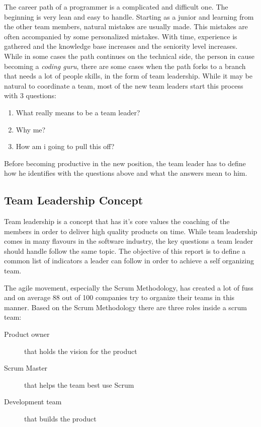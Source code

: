 
The career path of a programmer is a complicated and difficult one. The beginning is very lean and easy to handle. Starting as a junior and learning from the other team members, natural mistakes are usually made. This mistakes are often accompanied by some personalized mistakes. With time, experience is gathered and the knowledge base increases and the seniority level increases. While in some cases the path continues on the technical side, the person in cause becoming a \textit{coding guru}, there are some cases when the path forks to a branch that needs a lot of people skills, in the form of team leadership. While it may be natural to coordinate a team, most of the new team leaders start this process with 3 questions:

\begin{enumerate}
	\item What really means to be a team leader?
	\item Why me?
	\item How am i going to pull this off?
\end{enumerate}



Before becoming productive in the new position, the team leader has to define how he identifies with the questions above and what the answers mean to him.

\subsection{Team Leadership Concept}
\label{sub-sec:teamleadershipconcept}

Team leadership is a concept that has it's core values the coaching of the members in order to deliver high quality products on time. While team leadership comes in many flavours in the software industry, the key questions a team leader should handle follow the same topic. The objective of this report is to define a common list of indicators a leader can follow in order to achieve a self organizing team.

The agile movement, especially the Scrum Methodology, has created a lot of fuss and on average 88 out of 100 companies try to organize their teams in this manner\cite{agile-survey}. Based on the Scrum Methodology there are three roles \cite{scrum} inside a scrum team:

\begin{description}
	\item[Product owner] that holds the vision for the product
	\item[Scrum Master] that helps the team best use Scrum
	\item[Development team] that builds the product
\end{description}

